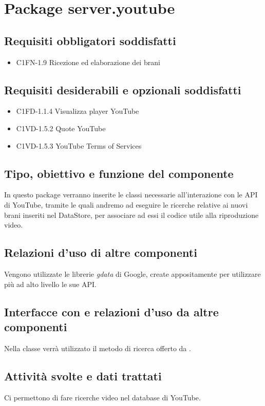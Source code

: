 \newpage
\section{Package server.youtube} %
\subsection*{Requisiti obbligatori soddisfatti}
\begin{itemize}
    \item C1FN-1.9 Ricezione ed elaborazione dei brani
\end{itemize}
\subsection*{Requisiti desiderabili e opzionali soddisfatti}
\begin{itemize}
    \item C1FD-1.1.4 Visualizza player YouTube
    \item C1VD-1.5.2 Quote YouTube
    \item C1VD-1.5.3 YouTube Terms of Services
\end{itemize}
\subsection*{Tipo, obiettivo e funzione del componente}
In questo package verranno inserite le classi necessarie all'interazione con le
API di YouTube, tramite le quali andremo ad eseguire le ricerche relative ai
nuovi brani inseriti nel DataStore, per associare ad essi il codice utile alla
riproduzione video.
\subsection*{Relazioni d'uso di altre componenti}
Vengono utilizzate le librerie \emph{gdata} di Google, create appositamente per
utilizzare pi\`u ad alto livello le sue API.
\subsection*{Interfacce con e relazioni d'uso da altre componenti}
Nella classe  verr\`a utilizzato il metodo di ricerca offerto da
.
\subsection*{Attivit\`a svolte e dati trattati}
Ci permettono di fare ricerche video nel database di YouTube.

